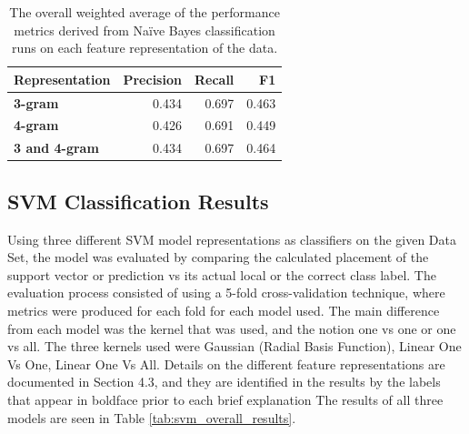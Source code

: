 \documentclass[conference]{sig-alternate-05-2015}
\begin{document}
\begin{table}[ht!]
  \centering
  \begin{tabular}{| l | r | r | r |}
    \hline
    \textbf{Representation} & \textbf{Precision} & \textbf{Recall} & \textbf{F1} \\
    \hline\hline
    \textbf{3-gram} & 0.434 & 0.697 & 0.463 \\
    \hline
    \textbf{4-gram} & 0.426 & 0.691 & 0.449 \\
    \hline
    \textbf{3 and 4-gram} & 0.434 & 0.697 & 0.464 \\
    \hline
  \end{tabular}
  \caption{The overall weighted average of the performance metrics derived from
  Na\"ive Bayes classification runs on each feature representation of the data.}
  \label{tab:bayes_overall_results}
\end{table}

\subsection{SVM Classification Results}\label{subsec:svm_results}

Using three different SVM model representations as classifiers on the given Data
Set, the model was evaluated by comparing the calculated placement of the
support vector or prediction vs its actual local or the correct class label. The
evaluation process consisted of using a 5-fold cross-validation technique, where
metrics were produced for each fold for each model used.  The main difference
from each model was the kernel that was used, and the notion one vs one or one
vs all. The three kernels used were Gaussian (Radial Basis Function), Linear One
Vs One, Linear One Vs All. Details on the different feature representations are
documented in Section 4.3, and they are identified in the results by the labels
that appear in boldface prior to each  brief explanation The results of all
three models are seen in Table \ref{tab:svm_overall_results}.\par
\end{document}
